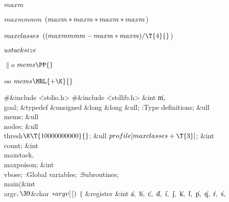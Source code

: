 \Y\B\4\D$\\{maxm}$ \5
\par
\B\4\D$\\{maxmmmm}$ \5
$(\\{maxm}*\\{maxm}*\\{maxm}*\\{maxm}{}$)\par
\B\4\D$\\{maxclasses}$ \5
$((\\{maxmmmm}-\\{maxm}*\\{maxm})/\T{4}{}$)\par
\B\4\D$\\{ustacksize}$ \5
\par
\B\4\D$\|o$ \5
$\\{mems}\PP{}$\par
\B\4\D$\\{oo}$ \5
$\\{mems}\MRL{+{\K}}{}$\par
\Y\B\8\#\&{include} \.{<stdio.h>}\6
\8\#\&{include} \.{<stdlib.h>}\6
\&{int} \|m${},{}$ \\{goal};\6
\&{typedef} \&{unsigned} \&{long} \&{long} \&{ull};\7
:Type definitions\X;\7
\&{ull} \\{mems};\6
\&{ull} \\{nodes};\6
\&{ull} \\{thresh}${}\K\T{10000000000}{}$;\6
\&{ull} ${}\\{profile}[\\{maxclasses}+\T{3}]{}$;\6
\&{int} \\{count};\6
\&{int} \\{maxstack}${},{}$ \\{maxpoison};\6
\&{int} \\{vbose};\7
:Global variables\X;\6
:Subroutines\X;\7
\\{main}(\&{int} \\{argc}${},\39{}$\&{char} ${}{*}\\{argv}[\,]){}$\1\1\2\2\6
${}\{{}$\1\6
\&{register} \&{int} \|a${},{}$ \|b${},{}$ \|c${},{}$ \|d${},{}$ \|i${},{}$ %
\|j${},{}$ \|k${},{}$ \|l${},{}$ \|p${},{}$ \|q${},{}$ \|r${},{}$ \|s${},{}$ %
